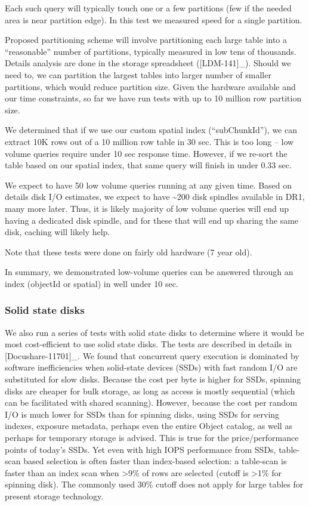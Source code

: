 \documentclass[DM,lsstdraft,toc]{lsstdoc}
\begin{document}
Each such query will typically touch one or a few partitions (few if the
needed area is near partition edge). In this test we measured speed for
a single partition.

Proposed partitioning scheme will involve partitioning each large table
into a ``reasonable'' number of partitions, typically measured in low
tens of thousands. Details analysis are done in the storage spreadsheet
({[}LDM-141{]}\_). Should we need to, we can partition the largest
tables into larger number of smaller partitions, which would reduce
partition size. Given the hardware available and our time constraints,
so far we have run tests with up to 10 million row partition size.

We determined that if we use our custom spatial index (``subChunkId''),
we can extract 10K rows out of a 10 million row table in 30 sec. This is
too long -- low volume queries require under 10 sec response time.
However, if we re-sort the table based on our spatial index, that same
query will finish in under 0.33 sec.

We expect to have 50 low volume queries running at any given time. Based
on details disk I/O estimates, we expect to have \textasciitilde{}200
disk spindles available in DR1, many more later. Thus, it is likely
majority of low volume queries will end up having a dedicated disk
spindle, and for these that will end up sharing the same disk, caching
will likely help.

Note that these tests were done on fairly old hardware (7 year old).

In summary, we demonstrated low-volume queries can be answered through
an index (objectId or spatial) in well under 10 sec.

\subsubsection{Solid state disks}\label{solid-state-disks}

We also run a series of tests with solid state disks to determine where
it would be most cost-efficient to use solid state disks. The tests are
described in details in {[}Docushare-11701{]}\_. We found that
concurrent query execution is dominated by software inefficiencies when
solid-state devices (SSDs) with fast random I/O are substituted for slow
disks. Because the cost per byte is higher for SSDs, spinning disks are
cheaper for bulk storage, as long as access is mostly sequential (which
can be facilitated with shared scanning). However, because the cost per
random I/O is much lower for SSDs than for spinning disks, using SSDs
for serving indexes, exposure metadata, perhaps even the entire Object
catalog, as well as perhaps for temporary storage is advised. This is
true for the price/performance points of today's SSDs. Yet even with
high IOPS performance from SSDs, table-scan based selection is often
faster than index-based selection: a table-scan is faster than an index
scan when \textgreater{}9\% of rows are selected (cutoff is
\textgreater{}1\% for spinning disk). The commonly used 30\% cutoff does
not apply for large tables for present storage technology.
\end{document}
